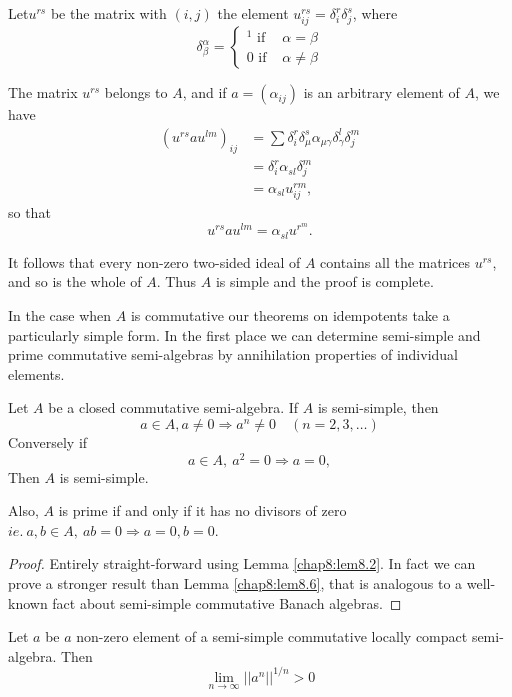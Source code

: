 Let\pageoriginale $u^{rs}$ be the matrix with $(i, j)$ the element
$u^{rs}_{ij}= \delta^r_i \delta ^s_j$, where  
\begin{equation*}
  \delta^\alpha_\beta =
  \begin{cases}
    ^1 \text{ if } & \alpha = \beta \\
    0 \text{ if } & \alpha \neq \beta
  \end{cases}
\end{equation*}

The matrix $u^{rs}$ belongs to $A$, and if $a=(\alpha_{ij})$ is an
arbitrary element of $A$, we have 
\begin{align*}
  (u^{rs} a u^{lm})_{ij} & = \sum \delta^r_i \delta^s_\mu \alpha_{\mu
    \gamma} \delta^l_\gamma \delta^m_j \\ 
  & = \delta^r_i \alpha_{sl} \delta^m_j \\
  & = \alpha_{sl} u^{rm}_{ij},
\end{align*}
so that
$$
u^{rs} a u^{lm} = \alpha_{sl} u^{r^m}.
$$

It follows that every non-zero two-sided ideal of $A$ contains all the
matrices $u^{rs}$, and so is the whole of $A$. Thus $A$ is simple and
the proof is complete. 

In the case when $A$ is commutative our theorems on idempotents take a
particularly simple form. In the first place we can determine
semi-simple and prime commutative semi-algebras by annihilation
properties of individual elements. 

\begin{lemma}\label{chap8:lem8.6} %
  Let $A$ be a closed commutative semi-algebra. If $A$ is semi-simple, then
  $$
  a \in A, a \neq 0 \Rightarrow a^n \neq 0 \quad (n=2, 3, \ldots)
  $$\pageoriginale
  Conversely if
  $$
  a \in A , ~a^2 = 0 \Rightarrow a = 0, 
  $$
  Then $A$ is semi-simple.
\end{lemma}

Also, $A$ is prime if and only if it has no divisors of zero $ie.~ a,
b \in A, ~ ab = 0 \Rightarrow a= 0, b=0$. 

\begin{proof}
  Entirely straight-forward using Lemma \ref{chap8:lem8.2}. In fact we
  can prove a stronger result than Lemma \ref{chap8:lem8.6}, that is
  analogous to a well-known fact about semi-simple commutative Banach
  algebras.  
\end{proof}

\begin{thmm}\label{chap8:thm8.13}  %
  Let $a$ be $a$ non-zero element of a semi-simple commutative locally
  compact semi-algebra. Then 
  $$
  \lim_{n \to \infty} || a^n ||^{1/n} > 0
  $$
\end{thmm}

